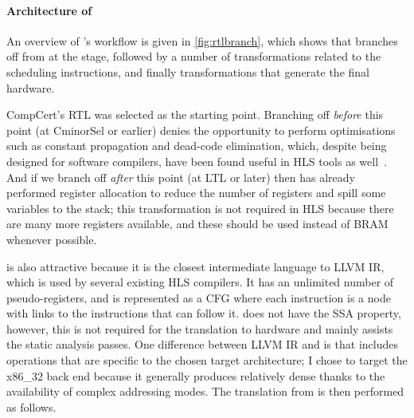 \paragraph{Architecture of \vericert{}}

An overview of \vericert{}'s workflow is given in \cref{fig:rtlbranch}, which
shows that \vericert{} branches off from \compcert{} at the \rtl{} stage,
followed by a number of transformations related to the scheduling instructions,
and finally transformations that generate the final hardware.

CompCert's \gls{RTL} was selected as the starting point. Branching off
\emph{before} this point (at CminorSel or earlier) denies \compcert{} the
opportunity to perform optimisations such as constant propagation and dead-code
elimination, which, despite being designed for software compilers, have been
found useful in HLS tools as well~\cite{cong11_high_level_synth_fpgas}. And if
we branch off \emph{after} this point (at \gls{LTL} or later) then \compcert{}
has already performed register allocation to reduce the number of registers and
spill some variables to the stack; this transformation is not required in HLS
because there are many more registers available, and these should be used
instead of \gls{BRAM} whenever possible.

\rtl{} is also attractive because it is the closest intermediate language to
LLVM \gls{IR}, which is used by several existing HLS compilers.  It has an
unlimited number of pseudo-registers, and is represented as a \gls{CFG} where
each instruction is a node with links to the instructions that can follow it.
\rtl{} does not have the SSA property, however, this is not required for the
translation to hardware and mainly assists the static analysis passes.  One
difference between LLVM \gls{IR} and \rtl{} is that \rtl{} includes operations
that are specific to the chosen target architecture; I chose to target the
x86\_32 back end because it generally produces relatively dense \rtl{} thanks to
the availability of complex addressing modes.  The translation from \rtl{} is
then performed as follows.


